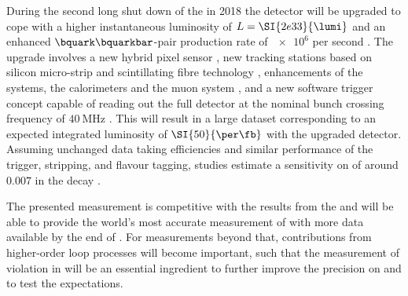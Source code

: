 During the second long shut down of the \LHC in 2018 the \LHCb detector will be
upgraded to cope with a higher instantaneous luminosity of $L =
\SI{2e33}{\lumi}$ and an enhanced $\bquark\bquarkbar$-pair production rate of
$\num{e6}$ per second \cite{Bediaga:1443882}. The upgrade involves a new hybrid
pixel sensor \VELO \cite{TDRVELO}, new tracking stations based on silicon
micro-strip and scintillating fibre technology \cite{TDRTracking}, enhancements
of the \RICH systems, the calorimeters and the muon system \cite{TDRPID}, and a
new software trigger concept capable of reading out the full detector at the
nominal bunch crossing frequency of $\SI{40}{\mega\hertz}$ \cite{TDRTrigger}.
This will result in a large dataset corresponding to an expected integrated
luminosity of $\SI{50}{\per\fb}$ with the upgraded detector. Assuming unchanged
data taking efficiencies and similar performance of the trigger, stripping, and
flavour tagging, \ToyMC studies estimate a sensitivity on
\sintwobeta of around $\num{0.007}$ \cite{Moedden:2015} in the decay
\BdToJpsiKS.

The presented measurement is competitive with the results from the \BFactories and
\LHCb will be able to provide the world's most accurate measurement of
\sintwobeta with more data available by the end of \RunTwo. For measurements
beyond that, contributions from higher-order loop processes will become
important, such that the measurement of \CP violation in \BsToJpsiKS will be an
essential ingredient to further improve the precision on \sintwobeta and to test
the \SM expectations.


